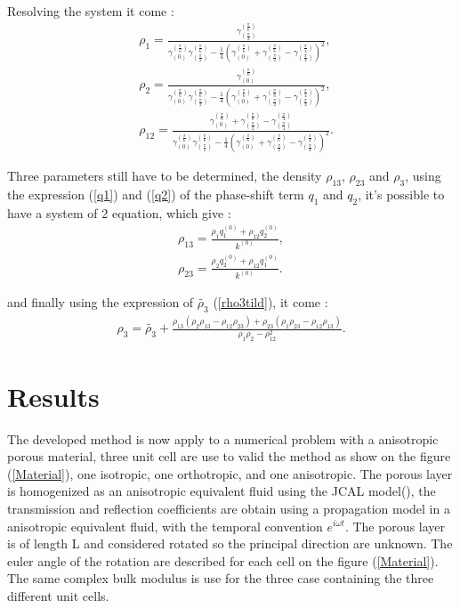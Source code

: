 \documentclass{article}
\begin{document}
    Resolving the system it come :
    \begin{align}
        &\rho_1=\frac{\gamma^{(\frac{\pi}{6})}_{(\frac{\pi}{2})}}{\gamma^{(\frac{\pi}{6})}_{(0)}\gamma^{(\frac{\pi}{6})}_{(\frac{\pi}{2})}-\frac{1}{4}(\gamma^{(\frac{\pi}{6})}_{(0)}+\gamma^{(\frac{\pi}{6})}_{(\frac{\pi}{2})}-\gamma^{(\frac{\pi}{4})}_{(\frac{\pi}{4})})^2},\label{rho1}\\
        &\rho_2=\frac{\gamma^{(\frac{\pi}{6})}_{(0)}}{\gamma^{(\frac{\pi}{6})}_{(0)}\gamma^{(\frac{\pi}{6})}_{(\frac{\pi}{2})}-\frac{1}{4}(\gamma^{(\frac{\pi}{6})}_{(0)}+\gamma^{(\frac{\pi}{6})}_{(\frac{\pi}{2})}-\gamma^{(\frac{\pi}{4})}_{(\frac{\pi}{4})})^2},\label{rho2}\\
        &\rho_{12}=\frac{\gamma^{(\frac{\pi}{6})}_{(0)}+\gamma^{(\frac{\pi}{6})}_{(\frac{\pi}{2})}-\gamma^{(\frac{\pi}{4})}_{(\frac{\pi}{4})}}{\gamma^{(\frac{\pi}{6})}_{(0)}\gamma^{(\frac{\pi}{6})}_{(\frac{\pi}{2})}-\frac{1}{4}(\gamma^{(\frac{\pi}{6})}_{(0)}+\gamma^{(\frac{\pi}{6})}_{(\frac{\pi}{2})}-\gamma^{(\frac{\pi}{4})}_{(\frac{\pi}{4})})^2}.\label{rho12}
    \end{align}
    
    Three parameters still have to be determined, the density $\rho_{13}$, $\rho_{23}$ and $\rho_3$, using the expression (\ref{q1}) and (\ref{q2}) of the phase-shift term $q_1$ and $q_2$, it's possible to have a system of 2 equation, which give :
    \begin{align}
    \rho_{13}=\frac{\rho_1q_1^{(0)}+\rho_{12}q_2^{(0)}}{k^{(0)}},\\
    \rho_{23}=\frac{\rho_2q_2^{(0)}+\rho_{12}q_1^{(0)}}{k^{(0)}}.
    \end{align}
    
    and finally using the expression of $\tilde{\rho_3}$ (\ref{rho3tild}), it come :
    \begin{align}
    \rho_3=\tilde{\rho_3}+\frac{\rho_{13}(\rho_2\rho_{13}-\rho_{12}\rho_{23})+\rho_{23}(\rho_1\rho_{23}-\rho_{12}\rho_{13})}{\rho_1\rho_2-\rho_{12}^2}.
    \end{align}

    
\section{Results}
    The developed method is now apply to a numerical problem with a anisotropic porous material, three unit cell are use to valid the method as show on the figure (\ref{Material}), one isotropic, one orthotropic, and one anisotropic. The porous layer is homogenized as an anisotropic equivalent fluid using the JCAL model(\cite{Allard}\cite{Lafarge}\cite{Jhonson}), the transmission and reflection coefficients are obtain using a propagation model in a anisotropic equivalent fluid, with the temporal convention $e^{i\omega t}$. The porous layer is of length L and considered rotated so the principal direction are unknown. The euler angle of the rotation are described for each cell on the figure (\ref{Material}). The same complex bulk modulus is use for the three case containing the three different unit cells. 
\end{document}
